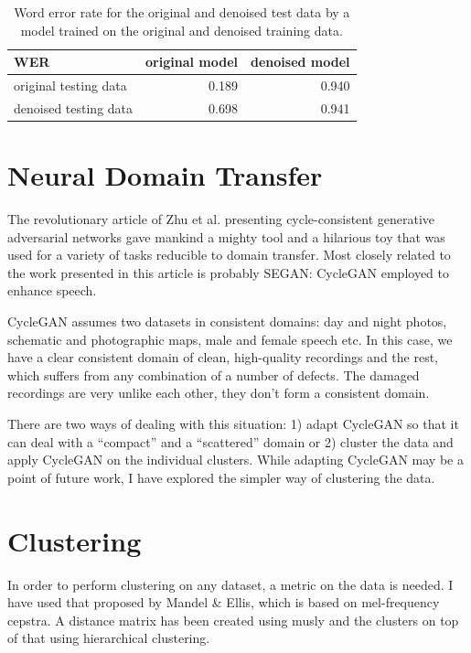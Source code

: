 \documentclass[12pt,a4paper]{report}
\begin{document}
\begin{table}[htpb]
\caption{Word error rate for the original and denoised test data by a model trained
on the original and denoised training data.}\label{tab:results-denoise}
\centering
\begin{tabular}{|l||r|r|}
\hline
WER    & original model & denoised model \\
\hline
original testing data & 0.189 & 0.940 \\
denoised testing data & 0.698 & 0.941 \\
\hline
\end{tabular}
\end{table}

\section{Neural Domain Transfer}

The revolutionary article of Zhu et al.\cite{cyclegan} presenting
cycle-consistent generative adversarial networks gave mankind a mighty tool and
a hilarious toy that was used for a variety of tasks reducible to
domain transfer.
Most closely related to the work presented in this article is probably
SEGAN\cite{pascual2017segan}: CycleGAN employed to enhance speech.

CycleGAN assumes two datasets in consistent domains: day and night photos,
schematic and photographic maps, male and female speech etc. In this case,
we have a clear consistent domain of clean, high-quality recordings and the
rest, which suffers from any combination of a number of defects. The damaged
recordings are very unlike each other, they don't form a consistent domain.

There are two ways of dealing with this situation: 1) adapt CycleGAN so that it
can deal with a ``compact'' and a ``scattered'' domain or 2) cluster the
data and apply CycleGAN on the individual clusters. While adapting CycleGAN may be a
point of future work, I have explored the simpler way of clustering the data.

\section{Clustering}

In order to perform clustering on any dataset, a metric on the data is needed.
I have used that proposed by Mandel \& Ellis\cite{mandel2005song}, which
is based on mel-frequency cepstra. A distance matrix has been created using
musly\cite{schnitzer2011using} and the clusters on top of that using
hierarchical clustering\cite{johnson1967hierarchical}.
\end{document}
